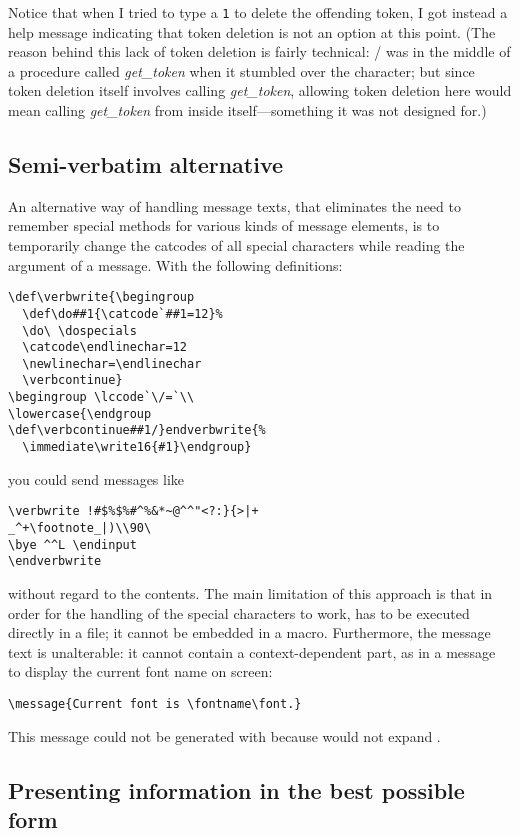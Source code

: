 {Notice that when I tried to type a \verb;1; to delete the offending
 token, I got instead a help message indicating that token
deletion is not an option at this point. (The reason behind this lack
of token deletion is fairly technical: \tex/ was in the middle of a
procedure called {\it get\_token} when it stumbled over the 
character; but since token deletion itself involves calling {\it
get\_token}, allowing token deletion here would mean calling
{\it get\_token}
from inside itself---something it was not designed for.)

\subsection{Semi-verbatim alternative}
An alternative way of handling message texts, that eliminates the
need to remember special methods for various kinds of
message elements, is to temporarily change the
catcodes of all special
characters while reading the argument of
a message. With the following definitions:
\begin{verbatim}
\def\verbwrite{\begingroup
  \def\do##1{\catcode`##1=12}%
  \do\ \dospecials
  \catcode\endlinechar=12
  \newlinechar=\endlinechar
  \verbcontinue}
\begingroup \lccode`\/=`\\
\lowercase{\endgroup
\def\verbcontinue##1/}endverbwrite{%
  \immediate\write16{#1}\endgroup}
\end{verbatim}
you could send messages like
\begin{verbatim}
\verbwrite !#$%$%#^%&*~@^^"<?:}{>|+
_^+\footnote_|)\\90\
\bye ^^L \endinput
\endverbwrite
\end{verbatim}
without regard to the contents. The main limitation of this approach
is that in order for the handling of the special characters to work,
\cw{verbwrite} has to be executed directly in a file; it cannot be
embedded in a macro. Furthermore, the message text is unalterable: it
cannot contain a context-dependent part, as in a message to display
the current font name on screen:
\begin{verbatim}
\message{Current font is \fontname\font.}
\end{verbatim}
This message could not be generated with  because
\cw{verbwrite} would not expand .

\subsection{Presenting information in the best possible form}

}
